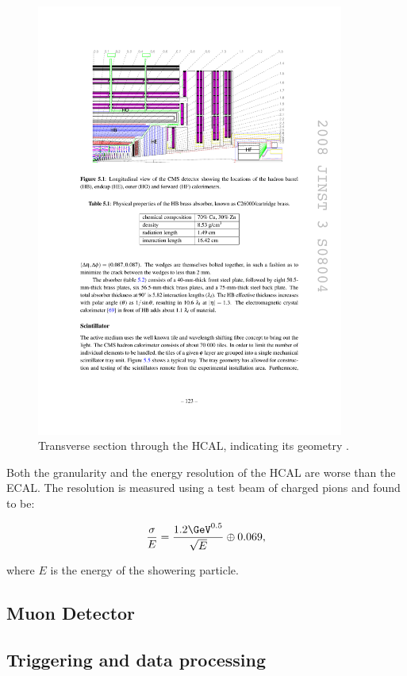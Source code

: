 \begin{figure}[htbp]
   \includegraphics[width=0.9\textwidth]{plots/detector/hcal_layout.pdf}
\caption{Transverse section through the \ac{HCAL}, indicating its geometry \cite{Chatrchyan:2008aa}.}
\label{fig:hcal}
\end{figure}

Both the granularity and the energy resolution of the \ac{HCAL} are worse than
the \ac{ECAL}. The resolution is measured using a test beam of charged pions and
found to be:

\begin{equation}
\frac{\sigma}{E} = \frac{1.2\GeV^{0.5}}{\sqrt{E}} \oplus 0.069,
\end{equation}

where $E$ is the energy of the showering particle. 


\subsection{Muon Detector}
\label{sec:muondetector}

\subsection{Triggering and data processing}
\label{sec:trigger}
